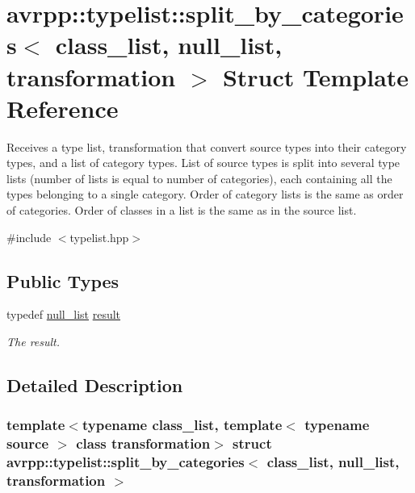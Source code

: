 \hypertarget{structavrpp_1_1typelist_1_1split__by__categories_3_01class__list_00_01null__list_00_01transformation_01_4}{
\section{avrpp::typelist::split\_\-by\_\-categories$<$ class\_\-list, null\_\-list, transformation $>$ Struct Template Reference}
\label{structavrpp_1_1typelist_1_1split__by__categories_3_01class__list_00_01null__list_00_01transformation_01_4}
}


Receives a type list, transformation that convert source types into their category types, and a list of category types. List of source types is split into several type lists (number of lists is equal to number of categories), each containing all the types belonging to a single category. Order of category lists is the same as order of categories. Order of classes in a list is the same as in the source list.  




{\ttfamily \#include $<$typelist.hpp$>$}

\subsection*{Public Types}
\begin{DoxyCompactItemize}
\item 
typedef \hyperlink{structavrpp_1_1typelist_1_1null__list}{null\_\-list} \hyperlink{structavrpp_1_1typelist_1_1split__by__categories_3_01class__list_00_01null__list_00_01transformation_01_4_abfde550ed6b71f7e9fb56f49f07734a4}{result}
\begin{DoxyCompactList}\small\item\em The result. \item\end{DoxyCompactList}\end{DoxyCompactItemize}


\subsection{Detailed Description}
\subsubsection*{template$<$typename class\_\-list, template$<$ typename source $>$ class transformation$>$ struct avrpp::typelist::split\_\-by\_\-categories$<$ class\_\-list, null\_\-list, transformation $>$}

